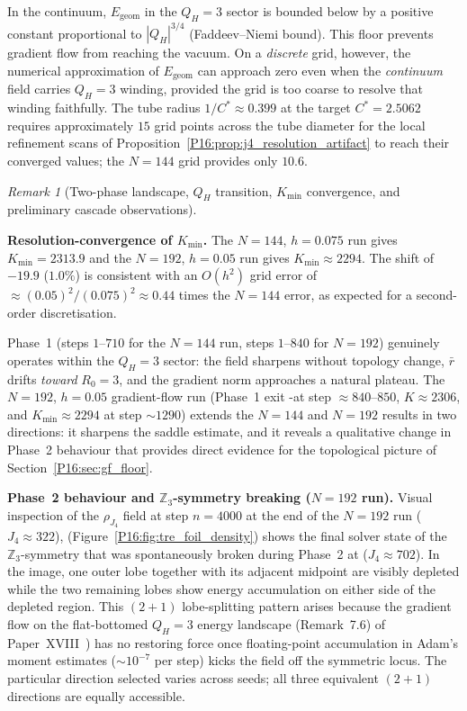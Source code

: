 \documentclass[11pt,a4paper]{article}
\theoremstyle{definition}\newtheorem{definition}[theorem]{Definition}
\theoremstyle{remark}
\newtheorem{remark}[theorem]{Remark}
\theoremstyle{definition}\newtheorem{construction}[theorem]{Construction}
\newcommand{\QH}{Q_H}
\begin{document}
In the continuum, $E_{\mathrm{geom}}$ in the $\QH=3$ sector is bounded
below by a positive constant proportional to $|\QH|^{3/4}$
(Faddeev--Niemi bound).  This floor prevents gradient flow from
reaching the vacuum.  On a \emph{discrete} grid, however, the
numerical approximation of $E_{\mathrm{geom}}$ can approach zero even
when the \emph{continuum} field carries $\QH=3$ winding, provided the
grid is too coarse to resolve that winding faithfully.  The tube radius
$1/C^*\approx0.399$ at the target $C^*=2.5062$ requires approximately
$15$ grid points across the tube diameter for the local refinement scans
of Proposition~\ref{P16:prop:j4_resolution_artifact} to reach their
converged values; the $N=144$ grid provides only $10.6$.

\begin{remark}[Two-phase landscape, $\QH$ transition, $K_{\min}$ convergence, and preliminary cascade observations]
\label{P16:rem:gf_twophase}

\textbf{Resolution-convergence of $K_{\min}$.}
The $N=144$, $h=0.075$ run gives $K_{\min}=2313.9$ and the $N=192$, $h=0.05$
run gives $K_{\min}\approx2294$. The shift of $-19.9$ ($1.0\%$) is consistent
with an $O(h^2)$ grid error of $\approx(0.05)^2/(0.075)^2\approx0.44$ times the
$N=144$ error, as expected for a second-order discretisation.

Phase~1 (steps $1$--$710$ for the $N=144$ run, steps $1$--$840$ for $N=192$)
genuinely operates within the $\QH=3$ sector: the field sharpens without
topology change, $\bar r$ drifts \emph{toward} $R_0=3$, and the gradient norm
approaches a natural plateau. The $N=192$, $h=0.05$ gradient-flow run
(Phase~1 exit -at step $\approx840$--$850$, $K \approx2306$, and
$K_{\min}\approx2294$ at step $\sim1290$) extends the $N=144$ and $N=192$
results in two directions: it sharpens the saddle estimate, and it reveals
a qualitative change in Phase~2 behaviour that provides direct evidence for
the topological picture of Section~\ref{P16:sec:gf_floor}.

\textbf{Phase~2 behaviour and $\mathbb{Z}_3$-symmetry breaking ($N=192$ run).}
Visual inspection of the $\rho_{J_4}$ field at step $n=4000$ at the end
of the $N=192$ run ($J_4\approx322$), (Figure~\ref{P16:fig:tre_foil_density}) shows
the final solver state of the $\mathbb{Z}_3$-symmetry that was spontaneously
broken during Phase~2 at ($J_4\approx702$). In the image, one outer lobe
together with its adjacent midpoint are visibly depleted while the two
remaining lobes show energy accumulation on either side of the depleted
region.  This $(2{+}1)$ lobe-splitting pattern arises because the gradient
flow on the flat-bottomed $\QH=3$ energy landscape (Remark~7.6)%
of Paper~XVIII~\cite{Paper18}) has no restoring force once floating-point
accumulation in Adam's moment estimates ($\sim10^{-7}$ per step) kicks the
field off the symmetric locus. The particular direction selected varies across
seeds; all three equivalent $(2{+}1)$ directions are equally accessible.


\end{remark}
\end{document}
